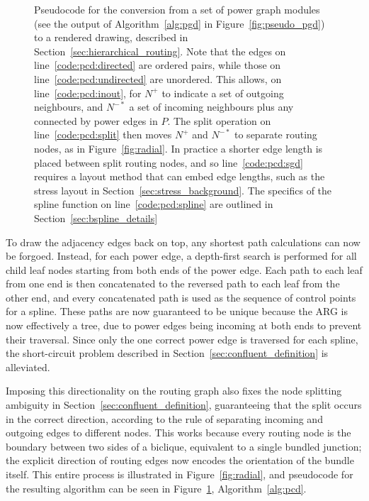 \begin{figure}
  \caption[Pseudocode for power-confluent drawing]{Pseudocode for the conversion from a set of power graph modules (see the output of Algorithm~\ref{alg:pgd} in Figure~\ref{fig:pseudo_pgd}) to a rendered drawing, described in Section~\ref{sec:hierarchical_routing}. 
  Note that the edges on line~\ref{code:pcd:directed} are ordered pairs, while those on line~\ref{code:pcd:undirected} are unordered. This allows, on line~\ref{code:pcd:inout}, for $N^+$ to indicate a set of outgoing neighbours, and $N^{-*}$ a set of incoming neighbours plus any connected by power edges in $P$.
  The split operation on line~\ref{code:pcd:split} then moves $N^+$ and $N^{-*}$ to separate routing nodes, as in Figure~\ref{fig:radial}.
  In practice a shorter edge length is placed between split routing nodes, and so line~\ref{code:pcd:sgd} requires a layout method that can embed edge lengths, such as the stress layout in Section~\ref{sec:stress_background}.
  The specifics of the spline function on line~\ref{code:pcd:spline} are outlined in Section~\ref{sec:bspline_details}}
  \label{fig:pseudo_pcd}
\end{figure}

To draw the adjacency edges back on top, any shortest path calculations can now be forgoed. Instead, for each power edge, a depth-first search is performed for all child leaf nodes starting from both ends of the power edge. Each path to each leaf from one end is then concatenated to the reversed path to each leaf from the other end, and every concatenated path is used as the sequence of control points for a spline.
These paths are now guaranteed to be unique because the ARG is now effectively a tree, due to power edges being incoming at both ends to prevent their traversal. Since only the one correct power edge is traversed for each spline, the short-circuit problem described in Section~\ref{sec:confluent_definition} is alleviated.

Imposing this directionality on the routing graph also fixes the node splitting ambiguity in Section~\ref{sec:confluent_definition}, guaranteeing that the split occurs in the correct direction, according to the rule of separating incoming and outgoing edges to different nodes.
This works because every routing node is the boundary between two sides of a biclique, equivalent to a single bundled junction; the explicit direction of routing edges now encodes the orientation of the bundle itself.
This entire process is illustrated in Figure~\ref{fig:radial}, and pseudocode for the resulting algorithm can be seen in Figure~\ref{fig:pseudo_pcd}, Algorithm~\ref{alg:pcd}.

